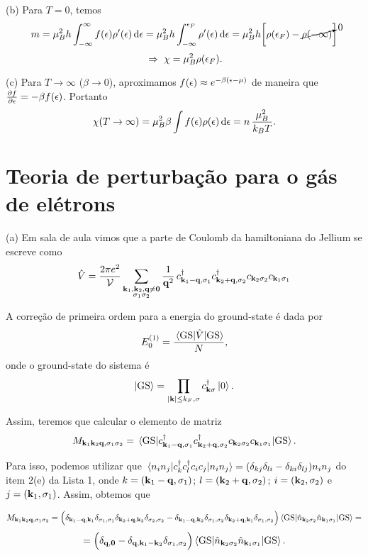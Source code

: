 \documentclass[a4paper,10pt]{article}
\begin{document}
(b) Para $T = 0$, temos
$$
m = \mu_B^2 h \int_{-\infty}^{\infty} f(\epsilon) \rho'(\epsilon) \dd{\epsilon} =
\mu_B^2 h \int_{-\infty}^{\epsilon_F} \rho'(\epsilon) \dd{\epsilon} =
\mu_B^2 h \qty[ \rho(\epsilon_F) - \cancelto{0}{\rho(-\infty)} ]
$$
$$
\; \Rightarrow \; \chi = \mu_B^2 \rho(\epsilon_F).
$$

(c) Para $T \to \infty$ ($\beta \to 0$), aproximamos $f(\epsilon) \approx e^{-\beta(\epsilon - \mu)}$ de maneira que $\pdv{f}{\epsilon} = -\beta f(\epsilon)$. Portanto
$$
\chi(T \to \infty) = \mu_B^2 \beta \int f(\epsilon) \rho(\epsilon) \dd{\epsilon} = n \, \frac{\mu_B^2}{k_B T}.
$$


\pagebreak


\section{Teoria de perturbação para o gás de elétrons}

(a) Em sala de aula vimos que a parte de Coulomb da hamiltoniana do Jellium se escreve como
\begin{equation} \label{eq:jellium}
\hat{V} = \frac{2 \pi e^2}{\mathcal{V}}
\sum_{\substack{\vb{k}_1, \vb{k}_2, \vb{q} \neq \vb{0} \\ \sigma_1 \sigma_2}} \frac{1}{\vb{q}^2} \,
c_{\vb{k}_1 - \vb{q}, \sigma_1}^\dagger c_{\vb{k}_2 + \vb{q}, \sigma_2}^\dagger c_{\vb{k}_2 \sigma_2} c_{\vb{k}_1 \sigma_1}
\end{equation}

A correção de primeira ordem para a energia do ground-state é dada por
$$
E_0^{(1)} = \frac{\ev{\hat{V}}{\text{GS}}}{N},
$$
onde o ground-state do sistema é
$$
\ket{\text{GS}} = \prod_{\abs{\vb{k}} \leq k_{F}, \sigma} c_{\vb{k} \sigma}^{\dagger} \ket{0}.
$$

Assim, teremos que calcular o elemento de matriz
$$
M_{\k_1 \k_2 \q, \s_1 \s_2} = \ev{c_{\k_1 - \q, \s_1}^\d c_{\k_2 + \q, \s_2}^\d c_{\k_2 \s_2} c_{\k_1 \s_1}}{\text{GS}}.
$$

Para isso, podemos utilizar que $\ev{c_k^\d c_l^\d c_i c_j}{n_i n_j} = (\delta_{kj} \delta_{li} - \delta_{ki} \delta_{lj}) n_i n_j$ do item 2(e) da Lista 1, onde $k = (\vb{k}_1 - \vb{q}, \sigma_1)$; $l = (\vb{k}_2 + \vb{q}, \sigma_2)$; $i = (\vb{k}_2, \sigma_2)$ e $j = (\vb{k}_1, \sigma_1)$. Assim, obtemos que

$$
M_{\k_1 \k_2 \q, \s_1 \s_2} =
\Big(
\delta_{\k_1 - \q, \k_1} \delta_{\s_1, \s_1} \delta_{\k_2 + \q, \k_2} \delta_{\s_2, \s_2} -
\delta_{\k_1 - \q, \k_2} \delta_{\s_1, \s_2} \delta_{\k_2 + \q, \k_1} \delta_{\s_1, \s_2}
\Big) \ev{\nn_{\k_2 \s_2} \nn_{\k_1 \s_1}}{\text{GS}} =
$$
$$
=
\Big(
\delta_{\q, \0} -
\delta_{\q, \k_1 - \k_2} \delta_{\s_1, \s_2}
\Big) \ev{\nn_{\k_2 \s_2} \nn_{\k_1 \s_1}}{\text{GS}}.
$$
\end{document}
